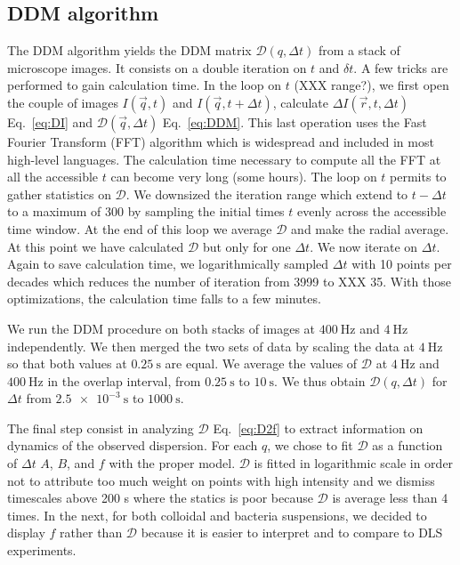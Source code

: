 \documentclass[%
 aip,
 jmp,%
 amsmath,amssymb,
reprint,%
]{revtex4-1}
\newcommand{\tg}[1]{{\color{magenta}#1}} %
\begin{document}
\subsection{DDM algorithm}

\tg{The DDM algorithm yields the DDM matrix $\mathcal{D}(q,\Delta t)$ from a stack of microscope images. It consists on a double iteration on $t$ and $\delta t$. A few tricks are performed to gain calculation time. In the loop on $t$ (XXX range?), we first open the couple of images $I(\vec{q},t)$ and $I(\vec{q},t+\Delta t)$, calculate $\Delta I(\vec{r},t, \Delta t)$  Eq.~\eqref{eq:DI} and $\mathcal{D}(\vec{q},\Delta t)$ Eq.~\eqref{eq:DDM}. This last operation uses the Fast Fourier Transform (FFT) algorithm which is widespread and included in most high-level languages. The calculation time necessary to compute all the FFT at all the accessible $t$ can become very long (some hours). The  loop on $t$ permits to gather statistics on $\mathcal{D}$. We downsized the iteration range which extend to $t-\Delta t$ to a maximum of 300 by sampling the initial times $t$  evenly across the accessible time window. At the end of this loop we average  $\mathcal{D}$ and make the radial average. At this point we have calculated $\mathcal{D}$ but only for one $\Delta t$. We now iterate on $\Delta t$. Again to save calculation time, we logarithmically sampled $\Delta t$ with 10 points per decades which reduces the number of iteration from 3999 to XXX 35. With those optimizations, the calculation time falls to a few minutes.

We run the DDM procedure on both stacks of images at $\SI{400}{\hertz}$ and $\SI{4}{\hertz}$ independently. We then merged the two sets of data by scaling the data at $\SI{4}{\hertz}$ so that both values at $\SI{0.25}{\second}$ are equal. We average the values of $\mathcal{D}$ at $\SI{4}{\hertz}$ and $\SI{400}{\hertz}$ in the overlap interval, from $\SI{0.25}{\second}$ to $\SI{10}{\second}$. We thus obtain $\mathcal{D} (q, \Delta t)$ for $\Delta t$ from $\SI{2.5e-3}{\second}$ to $\SI{1000}{\second}$. 

The final step consist in analyzing $\mathcal{D}$ Eq.~\eqref{eq:D2f} to extract information on dynamics of the observed dispersion. For each $q$, we chose to fit $\mathcal{D}$ as a function of $\Delta t$ $A$, $B$, and $f$ with the proper model. $\mathcal{D}$ is fitted in logarithmic scale in order not to attribute too much weight on points with high intensity and we dismiss timescales above 200 s where the statics is poor because $\mathcal{D}$ is average less than 4 times. In the next, for both colloidal and bacteria suspensions, we decided to display $f$ rather than $\mathcal{D}$ because it is easier to interpret and to compare to DLS experiments.}
\end{document}
